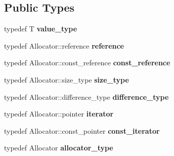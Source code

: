 \subsection*{Public Types}
\begin{DoxyCompactItemize}
\item 
\mbox{\label{classsisl_1_1array__n_acb884565621b3575ce99935d0e8bd222}} 
typedef T {\bfseries value\+\_\+type}
\item 
\mbox{\label{classsisl_1_1array__n_a7093571759e20b2293748a5a72538980}} 
typedef Allocator\+::reference {\bfseries reference}
\item 
\mbox{\label{classsisl_1_1array__n_a07b77cbc107044e4797bbbdd31ff01be}} 
typedef Allocator\+::const\+\_\+reference {\bfseries const\+\_\+reference}
\item 
\mbox{\label{classsisl_1_1array__n_adfa34e632e035525184024e41e6059c2}} 
typedef Allocator\+::size\+\_\+type {\bfseries size\+\_\+type}
\item 
\mbox{\label{classsisl_1_1array__n_a5c6b217f55e5f1f09382b1af6856a4b4}} 
typedef Allocator\+::difference\+\_\+type {\bfseries difference\+\_\+type}
\item 
\mbox{\label{classsisl_1_1array__n_a3de073fb52c6a7ef3d98301edc0c2922}} 
typedef Allocator\+::pointer {\bfseries iterator}
\item 
\mbox{\label{classsisl_1_1array__n_a539a2aa750b350a3e8eaeb8a267d8694}} 
typedef Allocator\+::const\+\_\+pointer {\bfseries const\+\_\+iterator}
\item 
\mbox{\label{classsisl_1_1array__n_ae665043637f423c1ef474515a129e0b7}} 
typedef Allocator {\bfseries allocator\+\_\+type}
\end{DoxyCompactItemize}
